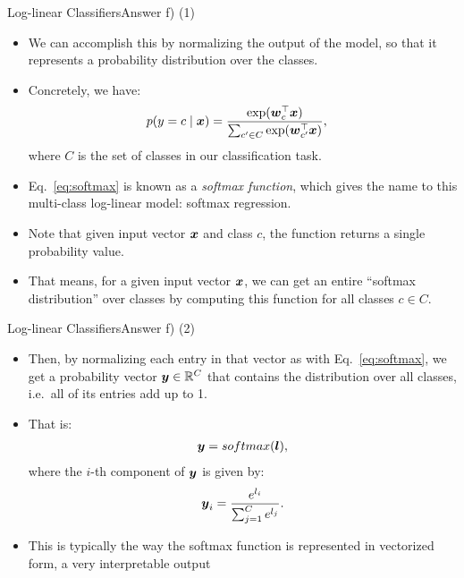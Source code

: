 \documentclass[t]{beamer}
\begin{document}
\begin{frame}{Log-linear Classifiers}{Answer f) (1)}
    \begin{itemize}
        \item We can accomplish this by normalizing the output of the model, so
              that it represents a probability distribution over the classes.
        \item Concretely, we have:
              \begin{align}\label{eq:softmax}
                  p(y=c\mid{\boldsymbol{x}}) & = \frac{\exp({\boldsymbol{w}}_c^\top{\boldsymbol{x}})}{\sum_{c'\in C}\exp({\boldsymbol{w}}_{c'}^\top{\boldsymbol{x}})},
              \end{align}
              where $C$ is the set of classes in our classification task.

        \item Eq.~\ref{eq:softmax} is known as a \emph{softmax function}, which
              gives the name to this multi-class log-linear model: softmax
              regression.
        \item Note that given input vector ${\boldsymbol{x}}$ and class $c$, the function
              returns a single probability value.
        \item That means, for a given input vector
              ${\boldsymbol{x}}$, we can get an entire ``softmax distribution'' over classes
              by computing this function for all classes $c\in C$.
    \end{itemize}
\end{frame}

\begin{frame}{Log-linear Classifiers}{Answer f) (2)}
    \begin{itemize}
        \item Then, by normalizing each entry in that vector as with
              Eq.~\ref{eq:softmax}, we get a probability vector ${\boldsymbol{y}}\in\mathbb{R}^C$
              that contains the distribution over all classes, i.e.\ all
              of its entries add up to 1.
        \item That is:
              \begin{align}
                  {\boldsymbol{y}} = softmax({\boldsymbol{l}}),
              \end{align}
              where the $i$-th component of ${\boldsymbol{y}}$ is given by:
              \begin{align}
                  {\boldsymbol{y}}_i = \frac{e^{l_i}}{\sum_{j=1}^{C}e^{l_j}}.
              \end{align}
        \item This is typically the way the softmax function is represented in
              vectorized form, a very interpretable output
    \end{itemize}
\end{frame}
\end{document}

